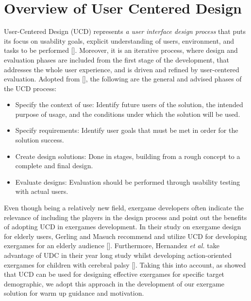 \section{Overview of User Centered Design}
User-Centered Design (UCD) represents \textit{a user interface design process} that puts its focus on usability goals, explicit understanding of users, environment, and tasks to be performed []. Moreover, it is an iterative process, where design and evaluation phases are included from the first stage of the development, that addresses the whole user experience, and is driven and refined by user-centered evaluation. %
Adopted from [], the following are the general and advised phases of the UCD process:
\begin{itemize}
\item Specify the context of use: Identify future users of the solution, the intended purpose of usage, and the conditions under which the solution will be used.
\item Specify requirements: Identify user goals that must be met in order for the solution success.
\item Create design solutions: Done in stages, building from a rough concept to a complete and final design.
\item Evaluate designs: Evaluation should be performed through usability testing with actual users.
\end{itemize}
Even though being a relatively new field, exergame developers often indicate the relevance of including the players in the design process and point out the benefits of adopting UCD in exergames development. In their study on exergame design for elderly users, Gerling and Masuch recommend and utilize UCD for developing exergames for an elderly audience []. Furthermore, Hernandez \textit{et al.} take advantage of UDC in their year long study whilst developing action-oriented exergames for children with cerebral palsy []. Taking this into account, as showed that UCD can be used for designing effective exergames for specific target demographic, we adopt this approach in the development of our exergame solution for warm up guidance and motivation.

